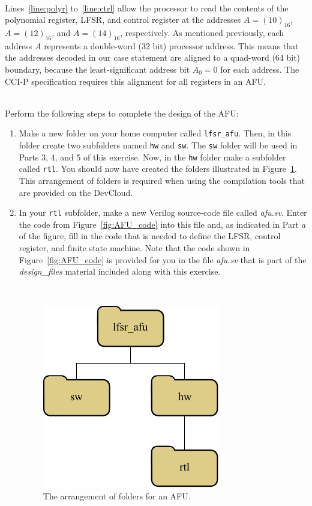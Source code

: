 \documentclass[epsfig,10pt,fullpage]{article}
\begin{document}
~\\
\noindent
Lines~\ref{line:polyr} to~\ref{line:ctrl} allow the processor to read the contents of the 
polynomial register, LFSR, and control register at the addresses $A=(10)_{16}$, $A=(12)_{16}$,
and $A=(14)_{16}$, respectively. As mentioned previously, each address $A$ represents a
double-word (32 bit) processor address. This means that the addresses decoded in our case
statement are aligned to a quad-word (64 bit) boundary, because the least-significant 
address bit $A_0 =0$ for each address. The CCI-P specification requires this alignment 
for all registers in an AFU.

~\\
\noindent
Perform the following steps to complete the design of the AFU:

\begin{enumerate}
\item
Make a new folder on your home computer called \texttt{lfsr\_afu}. Then, in this folder create two
subfolders named \texttt{hw} and \texttt{sw}. The \texttt{sw} folder will be used in 
Parts 3, 4, and 5 of this exercise. Now, in the \texttt{hw} folder make a subfolder 
called \texttt{rtl}. You should now have created the folders illustrated in 
Figure~\ref{fig:folders}. This arrangement of folders is required when using the compilation 
tools that are provided on the DevCloud.
\item
In your \texttt{rtl} subfolder, make a new Verilog source-code file called 
{\it afu.sv}. Enter the code from Figure~\ref{fig:AFU_code} into this file and, as indicated 
in Part $a$ of the figure, fill in the code that is needed to define the LFSR, control register, 
and finite state machine.  Note that the code shown in Figure~\ref{fig:AFU_code} is provided
for you in the file {\it afu.sv} that is part of the {\it design\_files} material included 
along with this exercise.

~\\
\begin{figure}[h]
   \begin{center}
       \includegraphics[]{figures/folders.pdf}
   \end{center}
   \caption{The arrangement of folders for an AFU.}
	\label{fig:folders}
\end{figure}


\end{enumerate}
\end{document}
